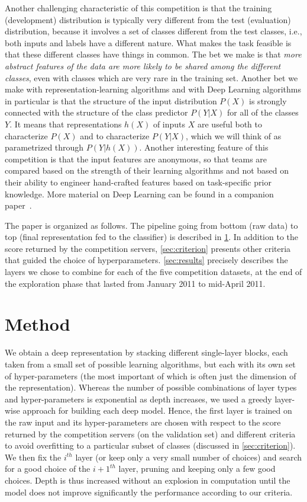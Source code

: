 Another challenging characteristic of this competition is that the training (development) distribution
is typically very different from the test (evaluation) distribution, because it involves
a set of classes different from the test classes, i.e., both inputs and labels
have a different nature. What makes the task feasible is that these different
classes have things in common. The bet we make %
is that {\em more abstract features of the data are more likely to be shared
among the different classes}, even with classes which are very rare in the
training set. Another bet we make with representation-learning algorithms
and with Deep Learning algorithms in particular is that
the structure of the input distribution $P(X)$
is strongly connected with the structure of the class predictor $P(Y|X)$
for all of the classes $Y$. It means that representations $h(X)$
of inputs $X$ are useful both to characterize $P(X)$ and to characterize
$P(Y|X)$, which we will think of as parametrized through $P(Y|h(X))$.
Another interesting feature of this competition is that the
input features are anonymous, so that teams are compared based on the strength
of their learning algorithms and not based on their ability to engineer
hand-crafted features based on task-specific prior knowledge.
More material on Deep Learning can be found in a companion paper~\cite{Bengio-DL-2011}.

The paper is organized as follows. The pipeline going from bottom (raw data)
to top (final representation fed to the classifier) is described in
\ref{sec:method}.  In addition to the score returned by the competition
servers, \ref{sec:criterion} presents other criteria that guided the
choice of hyperparameters. \ref{sec:results} precisely describes the
layers we chose to combine for each of the five competition datasets, at the end
of the exploration phase that lasted from January 2011 to mid-April 2011.

\section{Method}\label{sec:method}

We obtain a deep representation by
stacking different single-layer blocks, each taken from a small set of possible
learning algorithms, but each with its own set of hyper-parameters (the most
important of which is often just the dimension of the representation).
Whereas the number of possible combinations
of layer types  and hyper-parameters
is exponential as depth increases, we used a greedy layer-wise
approach \citep{Bengio-nips-2006} for building each deep model. Hence, the first
layer is trained on the raw input and its hyper-parameters are chosen with respect to
the score returned by the competition servers (on the validation set) and different criteria
to avoid overfitting to a particular subset of classes 
(discussed in \ref{sec:criterion}). We then fix the 
$i^{th}$ layer (or keep only a very small number of choices)
and search for a good choice of the $i+1^{th}$ layer, pruning
and keeping only a few good choices.
Depth is thus increased without an explosion in computation
until the model does not improve significantly the performance
according to our criteria.


